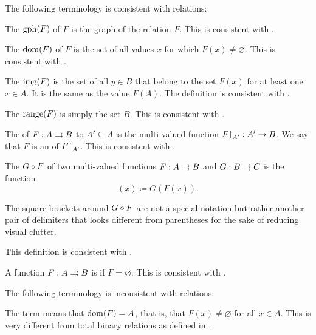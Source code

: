 \begin{definition}
  The following terminology is consistent with relations:
  \begin{thmenum}[resume=def:multi_valued_function]
     The  \( \operatorname{gph}(F) \) of \( F \) is the graph of the relation \( F \). This is consistent with .

     The  \( \operatorname{dom}(F) \) of \( F \) is the set of all values \( x \) for which \( F(x) \neq \varnothing \). This is consistent with .

     The  \( \operatorname{img}(F) \) is the set of all \( y \in B \) that belong to the set \( F(x) \) for at least one \( x \in A \). It is the same as the value \( F(A) \). The definition is consistent with .

     The  \( \operatorname{range}(F) \) is simply the set \( B \). This is consistent with .

     The  of \( F: A \rightrightarrows B \) to \( A' \subseteq A \) is the multi-valued function \( F{\upharpoonright}_{A'}: A' \rightarrow B \). We say that \( F \) is an  of \( F{\upharpoonright}_{A'} \). This is consistent with .

     The  \( G \mathbin \circ F \) of two multi-valued functions \( F: A \rightrightarrows B \) and \( G: B \rightrightarrows C \) is the function
    \begin{equation*}
      [G \bincirc F](x) \coloneqq G(F(x)).
    \end{equation*}

    The square brackets around \( G \mathbin \circ F \) are not a special notation but rather another pair of delimiters that looks different from parentheses for the sake of reducing visual clutter.

    This definition is consistent with .

     A function \( F: A \rightrightarrows B \) is  if \( F = \varnothing \). This is consistent with .
  \end{thmenum}

  The following terminology is inconsistent with relations:
  \begin{thmenum}[resume=def:multi_valued_function]
     The term  means that \( \operatorname{dom}(F) = A \), that is, that \( F(x) \neq \varnothing \) for all \( x \in A \). This is very different from total binary relations as defined in .


\end{thmenum}
\end{definition}
